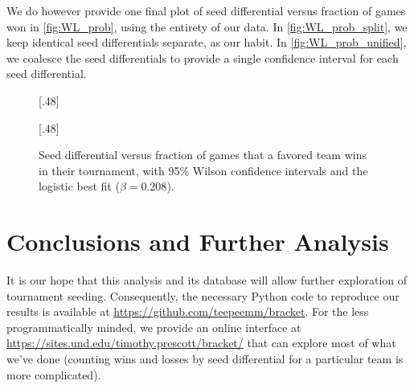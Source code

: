 \documentclass{article}
\newcommand\githuburl{https://github.com/teepeemm/bracket}
\newcommand\interfaceurl{https://sites.und.edu/timothy.prescott/bracket/}
\begin{document}
We do however provide one final plot of seed differential versus fraction of games won in \autoref{fig:WL_prob}, using the entirety of our data.  In \autoref{fig:WL_prob_split}, we keep identical seed differentials separate, as our habit.  In \autoref{fig:WL_prob_unified}, we coalesce the seed differentials to provide a single confidence interval for each seed differential.
\begin{figure}
[.48\textwidth]{%
%
}\hfill
{}[.48\textwidth]{%
}%
\caption{\label{fig:WL_prob}Seed differential versus fraction of games that a favored team wins in their tournament, with 95\% Wilson confidence intervals and the logistic best fit ($\beta=0.208$).}
\end{figure}


\section{Conclusions and Further Analysis}

It is our hope that this analysis and its database will allow further exploration of tournament seeding.  Consequently, the necessary Python code to reproduce our results is available at \url{\githuburl}.  For the less programmatically minded, we provide an online interface at \url{\interfaceurl} that can explore most of what we've done (counting wins and losses by seed differential for a particular team is more complicated).
\end{document}
